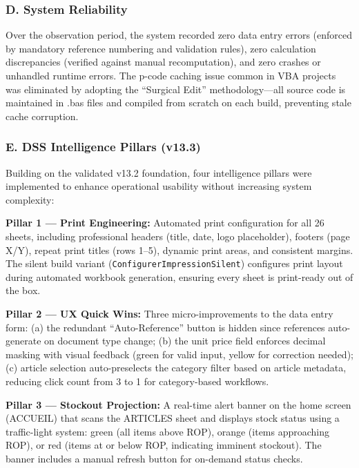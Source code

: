 ﻿\documentclass[conference]{IEEEtran}
\begin{document}
\subsubsection{D. System Reliability}\label{d.-system-reliability}

Over the observation period, the system recorded zero data entry errors
(enforced by mandatory reference numbering and validation rules), zero
calculation discrepancies (verified against manual recomputation), and
zero crashes or unhandled runtime errors. The p-code caching issue
common in VBA projects was eliminated by adopting the ``Surgical Edit''
methodology---all source code is maintained in .bas files and compiled
from scratch on each build, preventing stale cache corruption.

\subsubsection{E. DSS Intelligence Pillars
(v13.3)}\label{e.-dss-intelligence-pillars-v13.3}

Building on the validated v13.2 foundation, four intelligence pillars
were implemented to enhance operational usability without increasing
system complexity:

\textbf{Pillar 1 --- Print Engineering:} Automated print configuration
for all 26 sheets, including professional headers (title, date, logo
placeholder), footers (page X/Y), repeat print titles (rows 1--5),
dynamic print areas, and consistent margins. The silent build variant
(\texttt{ConfigurerImpressionSilent}) configures print layout during
automated workbook generation, ensuring every sheet is print-ready out
of the box.

\textbf{Pillar 2 --- UX Quick Wins:} Three micro-improvements to the
data entry form: (a) the redundant ``Auto-Reference'' button is hidden
since references auto-generate on document type change; (b) the unit
price field enforces decimal masking with visual feedback (green for
valid input, yellow for correction needed); (c) article selection
auto-preselects the category filter based on article metadata, reducing
click count from 3 to 1 for category-based workflows.

\textbf{Pillar 3 --- Stockout Projection:} A real-time alert banner on
the home screen (ACCUEIL) that scans the ARTICLES sheet and displays
stock status using a traffic-light system: green (all items above ROP),
orange (items approaching ROP), or red (items at or below ROP,
indicating imminent stockout). The banner includes a manual refresh
button for on-demand status checks.
\end{document}
